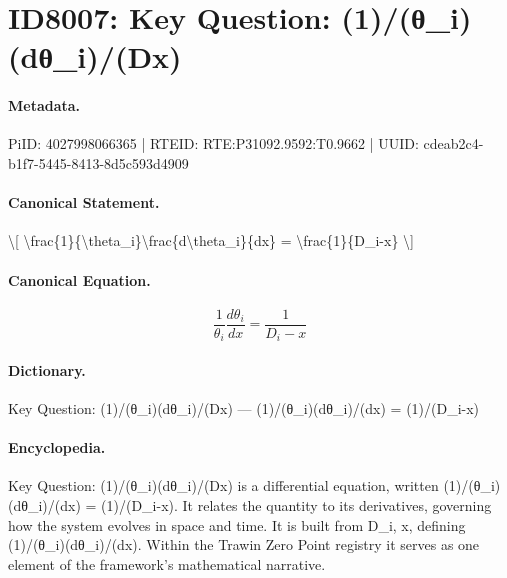 \section*{ID8007: Key Question: (1)/(θ\_i)(dθ\_i)/(Dx)}
\paragraph{Metadata.}
PiID: 4027998066365 | RTEID: RTE:P31092.9592:T0.9662 | UUID: cdeab2c4-b1f7-5445-8413-8d5c593d4909

\paragraph{Canonical Statement.}
\textbackslash{}[ \textbackslash{}frac\{1\}\{\textbackslash{}theta\_i\}\textbackslash{}frac\{d\textbackslash{}theta\_i\}\{dx\} = \textbackslash{}frac\{1\}\{D\_i-x\} \textbackslash{}]

\paragraph{Canonical Equation.}
\[
\frac{1}{\theta_i}\frac{d\theta_i}{dx} = \frac{1}{D_i-x}
\]

\paragraph{Dictionary.}
Key Question: (1)/(θ\_i)(dθ\_i)/(Dx) — (1)/(θ\_i)(dθ\_i)/(dx) = (1)/(D\_i-x)

\paragraph{Encyclopedia.}
Key Question: (1)/(θ\_i)(dθ\_i)/(Dx) is a differential equation, written (1)/(θ\_i)(dθ\_i)/(dx) = (1)/(D\_i-x). It relates the quantity to its derivatives, governing how the system evolves in space and time. It is built from D\_i, x, defining (1)/(θ\_i)(dθ\_i)/(dx). Within the Trawin Zero Point registry it serves as one element of the framework's mathematical narrative.

